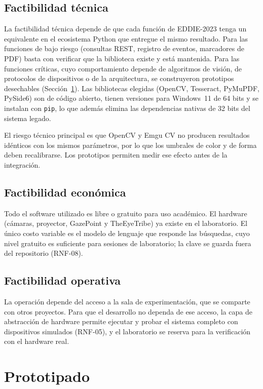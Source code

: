 \subsection{Factibilidad técnica}

La factibilidad técnica depende de que cada función de EDDIE-2023 tenga un equivalente en el ecosistema Python que entregue el mismo resultado. Para las funciones de bajo riesgo (consultas REST, registro de eventos, marcadores de PDF) basta con verificar que la biblioteca existe y está mantenida. Para las funciones críticas, cuyo comportamiento depende de algoritmos de visión, de protocolos de dispositivos o de la arquitectura, se construyeron prototipos desechables (Sección~\ref{sec:prototipado}). Las bibliotecas elegidas (OpenCV, Tesseract, PyMuPDF, PySide6) son de código abierto, tienen versiones para Windows~11 de 64 bits y se instalan con \texttt{pip}, lo que además elimina las dependencias nativas de 32 bits del sistema legado.

El riesgo técnico principal es que OpenCV y Emgu CV no producen resultados idénticos con los mismos parámetros, por lo que los umbrales de color y de forma deben recalibrarse. Los prototipos permiten medir ese efecto antes de la integración.

\subsection{Factibilidad económica}

Todo el software utilizado es libre o gratuito para uso académico. El hardware (cámaras, proyector, GazePoint y TheEyeTribe) ya existe en el laboratorio. El único costo variable es el modelo de lenguaje que responde las búsquedas, cuyo nivel gratuito es suficiente para sesiones de laboratorio; la clave se guarda fuera del repositorio (RNF-08).

\subsection{Factibilidad operativa}

La operación depende del acceso a la sala de experimentación, que se comparte con otros proyectos. Para que el desarrollo no dependa de ese acceso, la capa de abstracción de hardware permite ejecutar y probar el sistema completo con dispositivos simulados (RNF-05), y el laboratorio se reserva para la verificación con el hardware real.

\section{Prototipado}
\label{sec:prototipado}

